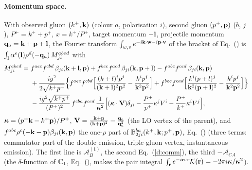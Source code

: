 \paragraph{Momentum space.} With observed gluon $(k^+,\mathbf{k})$ (colour $a$, polarisation $i$), second gluon $(p^+,\mathbf{p})$ ($b$, $j$), $P^+=k^++p^+$, $x=k^+/P^+$, target momentum $-\mathbf{l}$, projectile momentum $\mathbf{q}_a=\mathbf{k}+\mathbf{p}+\mathbf{l}$, the Fourier transform $\int_{w,v}e^{-i\mathbf{k}\cdot\mathbf{w}-i\mathbf{p}\cdot\mathbf{v}}$ of the bracket of Eq.~() is $\int_{\mathbf{l}}\alpha^e(\mathbf{l})\rho^d(-\mathbf{q}_a)\,M^{abed}_{ji}$ with
\begin{align}
M^{abed}_{ji}=\ &f^{aec}f^{cbd}\,\beta_{ji}(\mathbf{k}+\mathbf{l},\mathbf{p})+f^{bec}f^{acd}\,\beta_{ji}(\mathbf{k},\mathbf{p}+\mathbf{l})-f^{abc}f^{ced}\,\beta_{ji}(\mathbf{k},\mathbf{p})\notag\\
&+\frac{ig^2}{2\sqrt{k^+p^+}}\Big\{f^{aec}f^{cbd}\Big[\frac{(k+l)^ip^j}{(\mathbf{k}+\mathbf{l})^2\mathbf{p}^2}-\frac{k^ip^j}{\mathbf{k}^2\mathbf{p}^2}\Big]+f^{bec}f^{cad}\Big[\frac{k^i(p+l)^j}{\mathbf{k}^2(\mathbf{p}+\mathbf{l})^2}-\frac{k^ip^j}{\mathbf{k}^2\mathbf{p}^2}\Big]\Big\}\notag\\
&-\frac{ig^2\sqrt{k^+p^+}}{(P^+)^2}\,f^{cba}f^{ced}\,\frac{1}{\boldsymbol\kappa^2}\Big[(\boldsymbol\kappa\cdot\mathbf{V})\delta_{ji}-\frac{P^+}{p^+}\kappa^jV^i-\frac{P^+}{k^+}\kappa^iV^j\Big],\label{d:M}
\end{align}
$\boldsymbol\kappa=(p^+\mathbf{k}-k^+\mathbf{p})/P^+$, $\mathbf{V}=\frac{\mathbf{k}+\mathbf{p}}{(\mathbf{k}+\mathbf{p})^2}-\frac{\mathbf{q}_a}{\mathbf{q}_a^2}$ (the LO vertex of the parent), and $f^{abc}\rho^c(-\mathbf{k}-\mathbf{p})\beta_{ji}(\mathbf{k},\mathbf{p})$ the one-$\rho$ part of $\mathbb{B}^{ba}_{2ji}(k^+,\mathbf{k};p^+,\mathbf{p})$, Eq.~() (three terms: commutator part of the double emission, triple-gluon vertex, instantaneous emission). The first line is $\mathcal A_B^{(1)}$, the second Eq.~(\ref{d:comm}), the third $-\mathcal A_{CA}$ (the $\delta$-function of $\mathbb{C}_1$, Eq.~(), makes the pair integral $\int_{\mathbf{r}}e^{-i\boldsymbol\kappa\cdot\mathbf{r}}\mathcal{K}(\mathbf{r})=-2\pi i\boldsymbol\kappa/\boldsymbol\kappa^2$).

